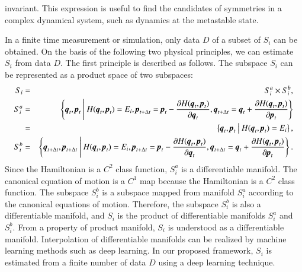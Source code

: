 \documentclass[preprint,
bibnotes,
 amsmath,amssymb,
 aps,
]{revtex4-1}
\newcounter{num}
\begin{document}
invariant. 
This expression is useful to find the candidates of symmetries in a complex dynamical system, such as dynamics at the metastable state.\par
In a finite time measurement or simulation, only data $D$ of a subset of $S_i$ can be obtained. 
On the basis of the following two physical principles, we can estimate $S_i$ from data $D$. The first principle is described as follows. 
The subspace $S_i$ can be represented as a product space of two subspaces:
\begin{eqnarray}
S_i &=& S_i^a \times S_i^b,\\
S_i^a &=& \left\{\textit{\textbf{q}}_t,\textit{\textbf{p}}_t\:\middle|\: H(\textit{\textbf{q}}_t,\textit{\textbf{p}}_t) = E_i,  {\textit{\textbf{p}}}_{t+\Delta t} = {\textit{\textbf{p}}}_t-\frac{\partial{H(\textit{\textbf{q}}_t,\textit{\textbf{p}}_t)}}{\partial{\textit{\textbf{q}}}_t}, \textit{\textbf{q}}_{t+\Delta t} = \textit{\textbf{q}}_t + \frac{\partial{H(\textit{\textbf{q}}_t,\textit{\textbf{p}}_t)}}{\partial{\textit{\textbf{p}}_t}}\right\}\\ &=& \left\{\textit{\textbf{q}}_t,\textit{\textbf{p}}_t\:\middle|\: H(\textit{\textbf{q}}_t,\textit{\textbf{p}}_t) = E_i\right\},\\
S_i^b &=&\left\{\textit{\textbf{q}}_{t+\Delta t},\textit{\textbf{p}}_{t+\Delta t}\:\middle|\: H(\textit{\textbf{q}}_t,\textit{\textbf{p}}_t) = E_i,  {\textit{\textbf{p}}}_{t+\Delta t} = {\textit{\textbf{p}}}_t-\frac{\partial{H(\textit{\textbf{q}}_t,\textit{\textbf{p}}_t)}}{\partial{\textit{\textbf{q}}}_t}, \textit{\textbf{q}}_{t+\Delta t} = \textit{\textbf{q}}_t + \frac{\partial{H(\textit{\textbf{q}}_t,\textit{\textbf{p}}_t)}}{\partial{\textit{\textbf{p}}_t}}\right\}.\\
\end{eqnarray}
Since the Hamiltonian is a $C^2$ class function, $S_i^a$ is a differentiable manifold. 
The canonical equation of motion is a $C^1$ map because the Hamiltonian is a $C^2$ class function. 
The subspace $S_i^b$ is a subspace mapped from manifold $S_i^a$ according to the canonical equations of motion. 
Therefore, the subspace $S_i^b$ is also a differentiable manifold, and $S_i$ is the product of differentiable manifolds $S_i^a$ and $S_i^b$. 
From a property of product manifold, $S_i$ is understood as a differentiable manifold. 
Interpolation of differentiable manifolds can be realized by machine learning methods such as deep learning. 
In our proposed framework, $S_i$ is estimated from a finite number of data $D$ using a deep learning technique. 
\end{document}
